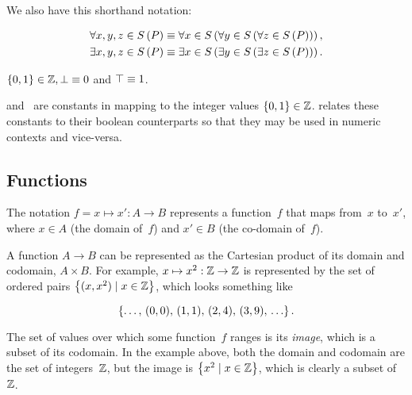 We also have this shorthand notation:

\begin{align}
  \Forall{x,y,z\in S}P \equiv
    \Forall{x\in S}{\Forall{y\in S}{\Forall{z\in S}P}}, \\
  \Exists{x,y,z\in S}P \equiv
    \Exists{x\in S}{\Exists{y\in S}{\Exists{z\in S}P}}.
\end{align}

\indexsym{}
%
\begin{definition}
  $\left\{0,1\right\}\in\mathbb{Z}, \bot \equiv 0$ and $\top \equiv 1$.
\end{definition}

\tamefalse{} and~\tametrue{} are constants in \tame{} mapping to the
  integer values $\{0,1\}\in\mathbb{Z}$.
 relates these constants to their
  boolean counterparts so that they may be used in numeric contexts
  and vice-versa.


\subsection{Functions}
\indexsym{}
\indexsym{}
The notation $f = x \mapsto x' : A\rightarrow B$ represents a function~$f$
  that maps from~$x$ to~$x'$,
    where $x\in A$ (the domain of~$f$) and $x'\in B$ (the co-domain of~$f$).

\indexsym{}
A function $A\rightarrow B$ can be represented as the Cartesian
  product of its domain and codomain, $A\times B$.
For example,
  $x\mapsto x^2 : \mathbb{Z}\rightarrow\mathbb{Z}$ is represented by the set of ordered
  pairs $\left\{(x,x^2) \mid x\in\mathbb{Z}\right\}$, which looks something like

\begin{equation*}
  \left\{\ldots,\,(0,0),\,(1,1),\,(2,4),\,(3,9),\,\ldots\right\}.
\end{equation*}

The set of values over which some function~$f$ ranges is its \emph{image},
  which is a subset of its codomain.
In the example above,
  both the domain and codomain are the set of integers~$\mathbb{Z}$,
  but the image is $\left\{x^2 \mid x\in\mathbb{Z}\right\}$,
    which is clearly a subset of~$\mathbb{Z}$.

